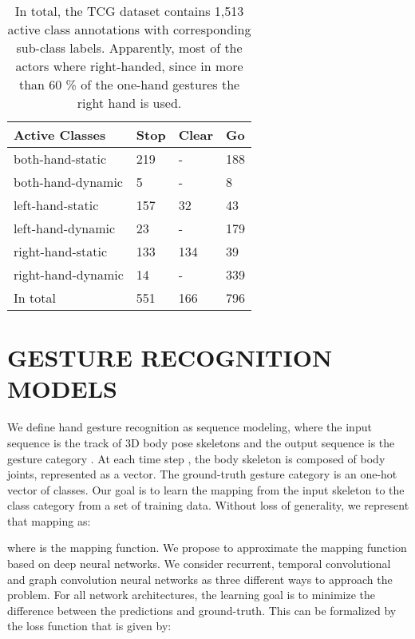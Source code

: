 \documentclass[letterpaper, 10 pt, conference]{ieeeconf}
\begin{document}
\begin{table}[t]
\centering
\begin{tabular}{l|lll}
\textbf{Active Classes} & \textbf{Stop} & \textbf{Clear} & \textbf{Go} \\ \hline
both-hand-static          & 219           & -              & 188                             \\
both-hand-dynamic         & 5             & -              & 8                                \\
left-hand-static          & 157           & 32             & 43                               \\
left-hand-dynamic         & 23            & -              & 179                             \\
right-hand-static         & 133           & 134            & 39                               \\
right-hand-dynamic        & 14            & -              & 339                            \\ \hline
In total             & 551           & 166            & 796                
\end{tabular}
\caption{In total, the TCG dataset contains 1,513 active class annotations with corresponding sub-class labels. Apparently, most of the actors where right-handed, since in more than 60 \% of the one-hand gestures the right hand is used.}
\label{tab:sub_classes}
\end{table}
\endgroup

\section{GESTURE RECOGNITION MODELS}\label{GEModels}

We define hand gesture recognition as sequence modeling, where the input sequence is the track of 3D body pose skeletons  and the output sequence is the gesture category . At each time step , the body skeleton  is composed of  body joints, represented as a vector. The ground-truth gesture category  is an one-hot vector of  classes. Our goal is to learn the mapping from the input skeleton to the class category from a set of training data. Without loss of generality, we represent that mapping as:

where  is the mapping function. We propose to approximate the mapping function based on deep neural networks. We consider recurrent, temporal convolutional and graph convolution neural networks as three different ways to approach the problem. For all network architectures, the learning goal is to minimize the difference between the predictions and ground-truth. This can be formalized by the loss function that is given by:
\end{document}
